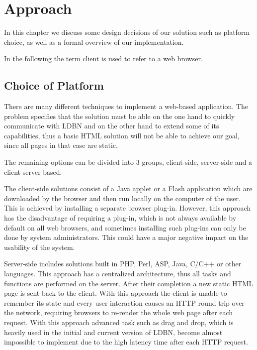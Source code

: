 \chapter{Approach}
\label{chap:approach}
In this chapter we discuss some design decisions of our solution such as 
platform choice, as well as a formal overview of our implementation. 

In the following the term client is used to refer to a web browser.

\section{Choice of Platform}
\label{sec:platform}
There are many different techniques to implement a web-based application. 
The problem specifies that the solution must be able on the one hand to 
quickly communicate with LDBN 
and on the other hand to extend some of its capabilities, 
thus a basic HTML solution will not be able to achieve our goal, 
since all pages in that case are static. 

The remaining options can be divided into 3 groups, client-side, server-side and
a client-server based. 

The client-side solutions consist of a Java applet or a Flash
application which are downloaded by the browser and then run locally on the computer of the user.
This is achieved by installing a separate browser plug-in. However, this approach has the disadvantage
of requiring a plug-in, which is not always available by default on all web browsers, and sometimes
installing such plug-ins can only be done by system administrators. This could have a major negative
impact on the usability of the system. 

Server-side includes solutions built in PHP, Perl, ASP, Java, C/C++ or other languages.
This approach
has a centralized architecture, thus all tasks and functions are performed on the server.
After their completion a new static HTML page is sent back to the client.
With this approach the client is unable to remember its state and 
every user interaction causes an HTTP round trip over the network, 
requiring browsers to re-render the whole web page after each request. With this approach
advanced task such as drag and drop, which is heavily used in the initial and current
version of LDBN, become almost impossible to implement due to the high latency time after each
HTTP request. 


